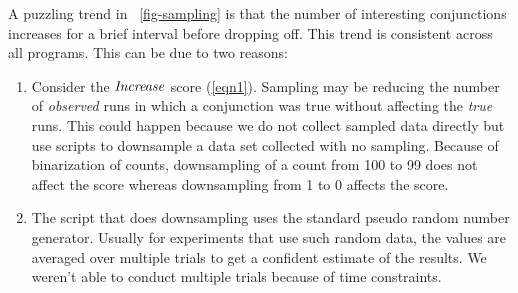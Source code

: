 A puzzling trend in ~\autoref{fig-sampling} is that the number of interesting conjunctions increases for a brief interval before dropping off.  This trend is consistent across all programs.  This can be due to two reasons:
\begin{enumerate}
\item Consider the $\mathit{Increase}$ score (\autoref{eqn1}).  Sampling may be reducing the number of \emph{observed} runs in which a conjunction was true without affecting the \emph{true} runs.  This could happen because we do not collect sampled data directly but use scripts to downsample a data set collected with no sampling.  Because of binarization of counts, downsampling of a count from 100 to 99 does not affect the score whereas downsampling from 1 to 0 affects the score.
\item The script that does downsampling uses the standard pseudo random number generator.  Usually for experiments that use such random data, the values are averaged over multiple trials to get a confident estimate of the results.  We weren't able to conduct multiple trials because of time constraints.
\end{enumerate}
